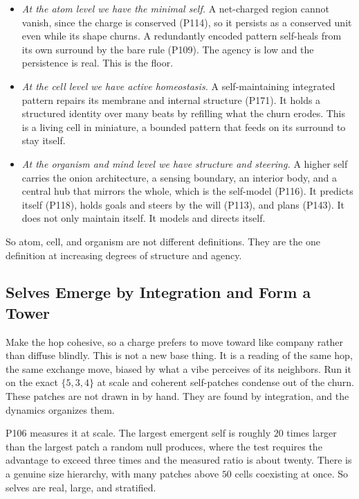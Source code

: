 \begin{itemize}
\item \emph{At the atom level we have the minimal self.} A net-charged region cannot vanish, since the charge is conserved (P114), so it persists as a conserved unit even while its shape churns. A redundantly encoded pattern self-heals from its own surround by the bare rule (P109). The agency is low and the persistence is real. This is the floor.

\item \emph{At the cell level we have active homeostasis.} A self-maintaining integrated pattern repairs its membrane and internal structure (P171). It holds a structured identity over many beats by refilling what the churn erodes. This is a living cell in miniature, a bounded pattern that feeds on its surround to stay itself.

\item \emph{At the organism and mind level we have structure and steering.} A higher self carries the onion architecture, a sensing boundary, an interior body, and a central hub that mirrors the whole, which is the self-model (P116). It predicts itself (P118), holds goals and steers by the will (P113), and plans (P143). It does not only maintain itself. It models and directs itself.
\end{itemize}

So atom, cell, and organism are not different definitions. They are the one definition at increasing degrees of structure and agency.

\subsection{Selves Emerge by Integration and Form a Tower}

Make the hop cohesive, so a charge prefers to move toward like company rather than diffuse blindly. This is not a new base thing. It is a reading of the same hop, the same exchange move, biased by what a vibe perceives of its neighbors. Run it on the exact $\{5,3,4\}$ at scale and coherent self-patches condense out of the churn. These patches are not drawn in by hand. They are found by integration, and the dynamics organizes them.

P106 measures it at scale. The largest emergent self is roughly $20$ times larger than the largest patch a random null produces, where the test requires the advantage to exceed three times and the measured ratio is about twenty. There is a genuine size hierarchy, with many patches above $50$ cells coexisting at once. So selves are real, large, and stratified.


